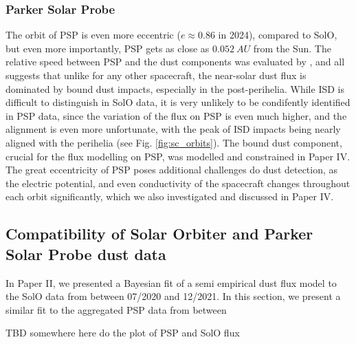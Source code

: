 \subsubsection{Parker Solar Probe}

The orbit of PSP is even more eccentric ($e \approx 0.86$ in 2024), compared to SolO, but even more importantly, PSP gets as close as $\SI{0.052}{AU}$ from the Sun. The relative speed between PSP and the dust components was evaluated by \citet{szalay2020near}, and all suggests that unlike for any other spacecraft, the near-solar dust flux is dominated by bound dust impacts, especially in the post-perihelia. While ISD is difficult to distinguish in SolO data, it is very unlikely to be condifently identified in PSP data, since the variation of the flux on PSP is even much higher, and the alignment is even more unfortunate, with the peak of ISD impacts being nearly aligned with the perihelia (see Fig. \ref{fig:sc_orbits}). The bound dust component, crucial for the flux modelling on PSP, was modelled and constrained in Paper IV. The great eccentricity of PSP poses additional challenges do dust detection, as the electric potential, and even conductivity of the spacecraft changes throughout each orbit significantly, which we also investigated and discussed in Paper IV.

\subsection{Compatibility of Solar Orbiter and Parker Solar Probe dust data}

In Paper II, we presented a Bayesian fit of a semi empirical dust flux model to the SolO data from between 07/2020 and 12/2021. In this section, we present a similar fit to the aggregated PSP data from between 

TBD somewhere here do the plot of PSP and SolO flux







